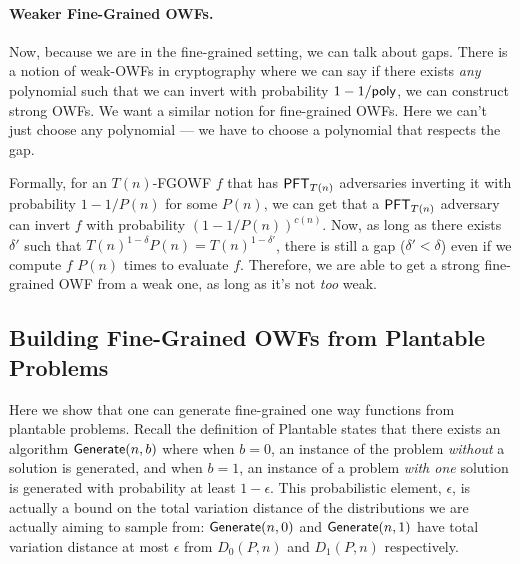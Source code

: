 \paragraph{Weaker Fine-Grained OWFs.} Now, because we are in the fine-grained setting, we can talk about gaps. There is a notion of weak-OWFs in cryptography where we can say if there exists \emph{any} polynomial such that we can invert with probability $1 - 1/\mathsf{poly}$, we can construct strong OWFs. We want a similar notion for fine-grained OWFs. Here we can't just choose any polynomial --- we have to choose a polynomial that respects the gap.

Formally, for an $T(n)$-FGOWF $f$ that has $\mathsf{PFT}_{T(n)}$ adversaries inverting it with probability $1 - 1/P(n)$ for some $P(n)$, we can get that a $\mathsf{PFT}_{T(n)}$ adversary can invert $f$ with probability $(1 - 1/P(n))^{c(n)}$. Now, as long as there exists $\delta'$ such that $T(n)^{1-\delta}P(n) = T(n)^{1-\delta'}$, there is still a gap ($\delta' < \delta$) even if we compute $f$ $P(n)$ times to evaluate $f$. Therefore, we are able to get a strong fine-grained OWF from a weak one, as long as it's not \emph{too} weak.

\subsection{Building Fine-Grained OWFs from Plantable Problems}\label{sec:building-fgowfs}

Here we show that one can generate fine-grained one way functions from plantable problems. Recall the definition of Plantable states that there exists an algorithm $\mathsf{Generate}(n,b)$ where when $b=0$, an instance of the problem \emph{without} a solution is generated, and when $b=1$, an instance of a problem \emph{with one} solution is generated with probability at least $1 - \epsilon$. This probabilistic element, $\epsilon$, is actually a bound on the total variation distance of the distributions we are actually aiming to sample from: $\mathsf{Generate}(n,0)$ and $\mathsf{Generate}(n,1)$ have total variation distance at most $\epsilon$ from $D_0(P,n)$ and $D_1(P,n)$ respectively.

